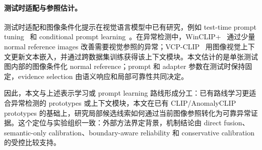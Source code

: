 \paragraph{测试时适配与参照估计。}
测试时适配和图像条件化提示在视觉语言模型中已有研究，例如 test-time prompt tuning~\cite{shu2022tpt} 和 conditional prompt learning~\cite{zhou2022cocoop}。在异常检测中，WinCLIP+~\cite{jeong2023winclip} 通过少量 normal reference images 改善需要视觉参照的异常；VCP-CLIP~\cite{qu2024vcpclip} 用图像视觉上下文更新文本嵌入，并通过跨数据集训练获得该上下文模块。本文估计的是单张测试图内部的图像条件化 normal reference；prompt 和 adapter 参数在测试时保持固定，evidence selection 由语义响应和局部可靠性共同决定。

因此，本文与上述表示学习或 prompt learning 路线形成分工：已有路线学习更适合异常检测的 prototypes 或上下文模块，本文在已有 CLIP/AnomalyCLIP prototypes 的基础上，研究局部候选线索如何通过当前图像参照转化为可靠异常证据。这个定位与实验组织一致：外部方法界定背景，机制结论由 direct fusion、semantic-only calibration、boundary-aware reliability 和 conservative calibration 的受控比较支持。
